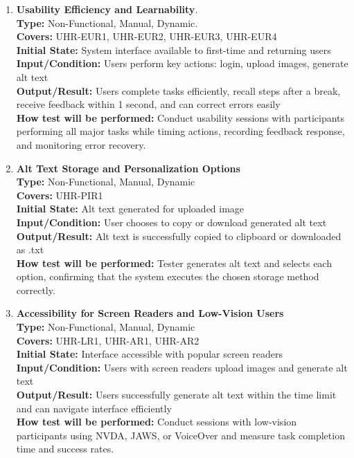 \documentclass[12pt, titlepage]{article}
\begin{document}
\begin{enumerate}[label=NFR-ST \arabic*., wide=0pt, leftmargin=*]
  \item \textbf{Usability Efficiency and Learnability}. \\[2mm]
    \textbf{Type:} Non-Functional, Manual, Dynamic. \\
    \textbf{Covers:} UHR-EUR1, UHR-EUR2, UHR-EUR3, UHR-EUR4 \\
    \textbf{Initial State:} System interface available to first-time
    and returning users \\
    \textbf{Input/Condition:} Users perform key actions: login,
    upload images, generate alt text \\
    \textbf{Output/Result:} Users complete tasks efficiently, recall
    steps after a break, receive feedback within 1 second, and can
    correct errors easily \\[2mm]
    \textbf{How test will be performed:} Conduct usability sessions
    with participants performing all major tasks while timing
    actions, recording feedback response, and monitoring error recovery.

  \item \textbf{Alt Text Storage and Personalization Options} \\[2mm]
    \textbf{Type:} Non-Functional, Manual, Dynamic \\
    \textbf{Covers:} UHR-PIR1 \\
    \textbf{Initial State:} Alt text generated for uploaded image \\
    \textbf{Input/Condition:} User chooses to copy or download
    generated alt text \\
    \textbf{Output/Result:} Alt text is successfully copied to
    clipboard or downloaded as .txt \\[2mm]
    \textbf{How test will be performed:} Tester generates alt text
    and selects each option, confirming that the system executes the
    chosen storage method correctly.

  \item \textbf{Accessibility for Screen Readers and Low-Vision Users} \\[2mm]
    \textbf{Type:} Non-Functional, Manual, Dynamic \\
    \textbf{Covers:} UHR-LR1, UHR-AR1, UHR-AR2 \\
    \textbf{Initial State:} Interface accessible with popular screen readers \\
    \textbf{Input/Condition:} Users with screen readers upload images
    and generate alt text \\
    \textbf{Output/Result:} Users successfully generate alt text
    within the time limit and can navigate interface efficiently \\[2mm]
    \textbf{How test will be performed:} Conduct sessions with
    low-vision participants using NVDA, JAWS, or VoiceOver and
    measure task completion time and success rates.


\end{enumerate}
\end{document}

